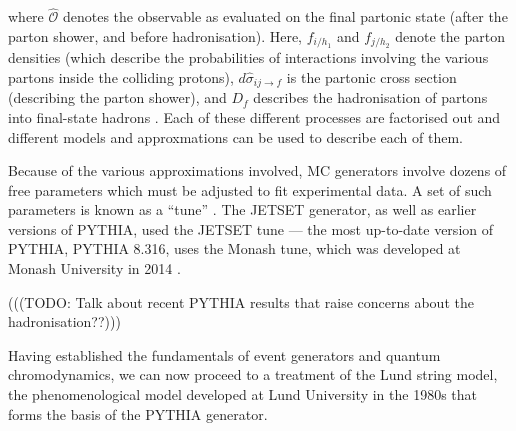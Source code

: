 \documentclass[12pt,a4paper]{report}
\begin{document}
where $\hat{\mathcal{O}}$ denotes the observable as evaluated on the final partonic state (after the parton shower, and before hadronisation). Here, $f_{i/h_1}$ and $f_{j/h_2}$ denote the parton densities (which describe the probabilities of interactions involving the various partons inside the colliding protons), $d\hat{\sigma}_{ij\rightarrow f}$ is the partonic cross section (describing the parton shower), and $D_f$ describes the hadronisation of partons into final-state hadrons \cite{Skands:2012ts}. Each of these different processes are factorised out and different models and approxmations can be used to describe each of them.

Because of the various approximations involved, MC generators involve dozens of free parameters which must be adjusted to fit experimental data. A set of such parameters is known as a ``tune'' \cite{Bierlich:2022pfr,Buckley:2011ms}. The JETSET generator, as well as earlier versions of PYTHIA, used the JETSET tune --- the most up-to-date version of PYTHIA, PYTHIA 8.316, uses the Monash tune, which was developed at Monash University in 2014 \cite{Bierlich:2022pfr,Skands:2014pea}.

(((TODO: Talk about recent PYTHIA results that raise concerns about the hadronisation??)))

Having established the fundamentals of event generators and quantum chromodynamics, we can now proceed to a treatment of the Lund string model, the phenomenological model developed at Lund University in the 1980s that forms the basis of the PYTHIA generator.
\end{document}
